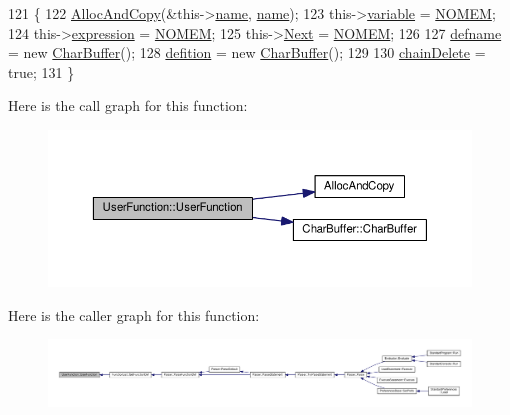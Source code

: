 \begin{DoxyCode}
121 \{
122     \hyperlink{clib_8h_a5bed05c70cb17e541fee570b5dc32e1a}{AllocAndCopy}(&this->\hyperlink{classUserFunction_a7cb07de0ad054d5001875aa2b3ad639d}{name}, \hyperlink{classUserFunction_a7cb07de0ad054d5001875aa2b3ad639d}{name});
123     this->\hyperlink{classUserFunction_a43e22a8c48e1d4770b0c4eadc3254aa8}{variable} = \hyperlink{platform_8h_a46ff2bfbf0d44b8466a2251d5bd5e6f8}{NOMEM};
124     this->\hyperlink{classUserFunction_ab7a0fb4f1265946883ef4e52dbe032f7}{expression} = \hyperlink{platform_8h_a46ff2bfbf0d44b8466a2251d5bd5e6f8}{NOMEM};
125     this->\hyperlink{classUserFunction_a5463f575d2ed50c0dbe069ec2841a5c9}{Next} = \hyperlink{platform_8h_a46ff2bfbf0d44b8466a2251d5bd5e6f8}{NOMEM};
126 
127     \hyperlink{classUserFunction_a722d65ef9f73e516689cb474e318b9f7}{defname} = \textcolor{keyword}{new} \hyperlink{classCharBuffer}{CharBuffer}();
128     \hyperlink{classUserFunction_aa39d63ff3cb597dc0d97667743d21f77}{defition} = \textcolor{keyword}{new} \hyperlink{classCharBuffer}{CharBuffer}();
129 
130     \hyperlink{classUserFunction_a86fecef5db791181f188bef0d7898de0}{chainDelete} = \textcolor{keyword}{true};
131 \}
\end{DoxyCode}


Here is the call graph for this function\+:\nopagebreak
\begin{figure}[H]
\begin{center}
\leavevmode
\includegraphics[width=350pt]{classUserFunction_a9e07b00bd2ff918fd11767cb627ad7df_cgraph}
\end{center}
\end{figure}




Here is the caller graph for this function\+:\nopagebreak
\begin{figure}[H]
\begin{center}
\leavevmode
\includegraphics[width=350pt]{classUserFunction_a9e07b00bd2ff918fd11767cb627ad7df_icgraph}
\end{center}
\end{figure}


